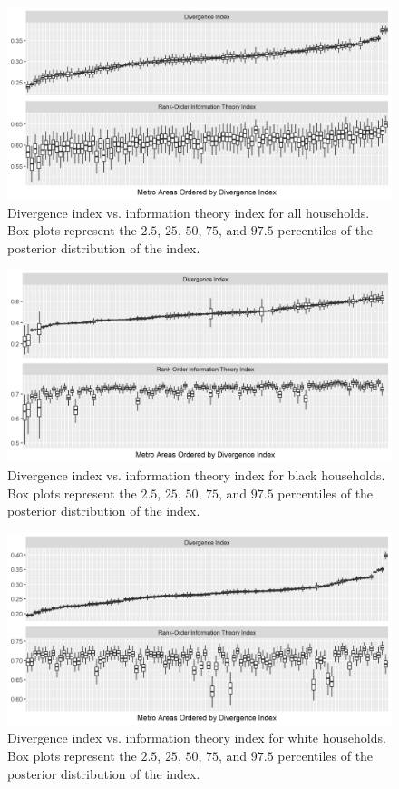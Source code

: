 \documentclass[12pt]{article}
\begin{document}
\begin{figure}[ht]
\centering
\includegraphics[scale = 0.9]{index_plot_combined.png}
\caption{Divergence index vs. information theory index for all households. Box plots represent the $2.5$, $25$, $50$, $75$, and $97.5$ percentiles of the posterior distribution of the index.}
\label{fig:indexplot}
\end{figure}

\begin{figure}[ht]
\centering
\includegraphics[scale = 0.9]{index_plot_black.png}
\caption{Divergence index vs. information theory index for black households. Box plots represent the $2.5$, $25$, $50$, $75$, and $97.5$ percentiles of the posterior distribution of the index.}
\label{fig:blackindexplot}
\end{figure}

\begin{figure}[ht]
\centering
\includegraphics[scale = 0.9]{index_plot_white.png}
\caption{Divergence index vs. information theory index for white households. Box plots represent the $2.5$, $25$, $50$, $75$, and $97.5$ percentiles of the posterior distribution of the index.}
\label{fig:whiteindexplot}
\end{figure}
\end{document}
